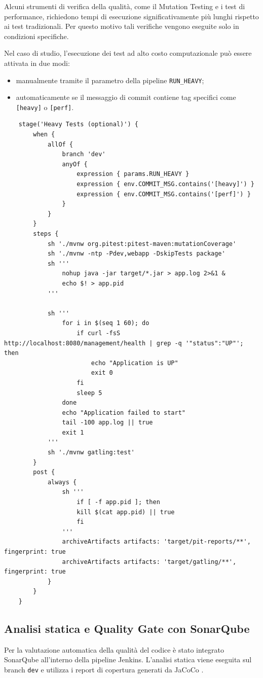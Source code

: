 Alcuni strumenti di verifica della qualità, come il Mutation Testing e i test di performance, richiedono tempi di esecuzione significativamente più lunghi rispetto ai test tradizionali. Per questo motivo tali verifiche vengono eseguite solo in condizioni specifiche.

Nel caso di studio, l'esecuzione dei test ad alto costo computazionale può essere attivata in due modi:

\begin{itemize}
	\item manualmente tramite il parametro della pipeline \texttt{RUN\_HEAVY};
	\item automaticamente se il messaggio di commit contiene tag specifici come \texttt{[heavy]} o \texttt{[perf]}.
\end{itemize}

\captionsetup{type=listing}
\label{lst:jenkins-heavy}
\begin{verbatim}
	stage('Heavy Tests (optional)') {
		when {
			allOf {
				branch 'dev'
				anyOf {
					expression { params.RUN_HEAVY }
					expression { env.COMMIT_MSG.contains('[heavy]') }
					expression { env.COMMIT_MSG.contains('[perf]') }
				}
			}
		}
		steps {
			sh './mvnw org.pitest:pitest-maven:mutationCoverage'
			sh './mvnw -ntp -Pdev,webapp -DskipTests package'
			sh '''
				nohup java -jar target/*.jar > app.log 2>&1 &
				echo $! > app.pid
			'''
			
			sh '''
				for i in $(seq 1 60); do
					if curl -fsS http://localhost:8080/management/health | grep -q '"status":"UP"'; then
						echo "Application is UP"
						exit 0
					fi
					sleep 5
				done
				echo "Application failed to start"
				tail -100 app.log || true
				exit 1
			'''  
			sh './mvnw gatling:test'
		}
		post {
			always {
				sh '''
					if [ -f app.pid ]; then
					kill $(cat app.pid) || true
					fi
				'''
				archiveArtifacts artifacts: 'target/pit-reports/**', fingerprint: true
				archiveArtifacts artifacts: 'target/gatling/**', fingerprint: true
			}
		}
	}
\end{verbatim}

\subsection{Analisi statica e Quality Gate con SonarQube}
\label{sub:sonar}

Per la valutazione automatica della qualità del codice è stato integrato SonarQube all'interno della pipeline Jenkins. L'analisi statica viene eseguita sul branch \texttt{dev} e utilizza i report di copertura generati da JaCoCo \cite{SonarQubeDocs}.

